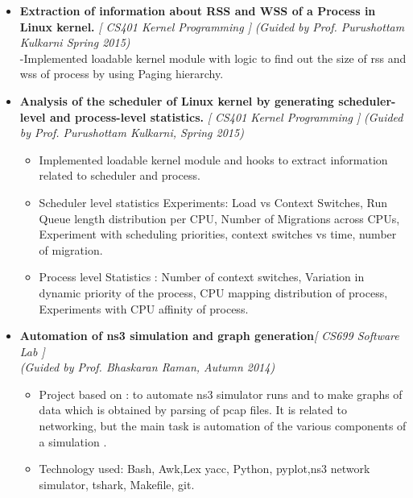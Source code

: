 \begin{itemize}
	\item \textbf{Extraction of information about RSS and WSS of a Process in Linux kernel.} \hfill \emph{[ CS401 Kernel Programming ]}\hfill 
	\emph{(Guided by Prof. Purushottam Kulkarni Spring 2015)} \\
	-Implemented loadable kernel module with logic to find out the size of rss and wss of process by using Paging hierarchy. \\[-0.6cm]
	\item \textbf{Analysis of the scheduler of Linux kernel by generating scheduler-level and process-level statistics.} \hfill \emph{[ CS401 Kernel Programming ]} \hfill
	\emph{(Guided by Prof. Purushottam Kulkarni, Spring 2015)}\hfill \\[-0.7cm]
	\begin{itemize}
	 \item Implemented loadable kernel module and hooks to extract information related to scheduler and process.\\[-0.6cm]
	 \item Scheduler level statistics Experiments: Load vs Context Switches, Run Queue length distribution per CPU, Number of Migrations across CPUs, Experiment with scheduling priorities, context switches vs time, number of migration.\\[-0.6cm]
	 \item Process level Statistics : Number of context switches, Variation in dynamic priority of the process, CPU mapping distribution of process, Experiments with CPU affinity of process.\\[-0.6cm]
	\end{itemize}
	\item \textbf{Automation of ns3 simulation and graph generation}\hfill\emph{[ CS699 Software Lab ]}  \\
	\emph{(Guided by Prof. Bhaskaran Raman, Autumn 2014)}  \\[-0.6cm]
	\begin{itemize}
	 \item Project based on : to automate ns3 simulator runs and to make graphs of data which is obtained by parsing of pcap
files. It is related to networking, but the main task is automation of the various components of a simulation .
	 \item Technology used: Bash, Awk,Lex yacc, Python, pyplot,ns3 network simulator, tshark, Makefile, git.
	\end{itemize}

		
\end{itemize}
